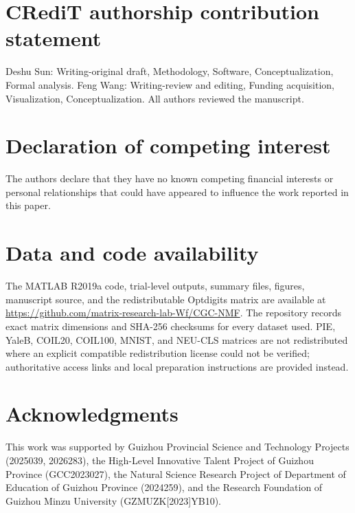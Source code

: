 \documentclass[11pt]{article}
\theoremstyle{remark}
\begin{document}
\section*{CRediT authorship contribution statement}

Deshu Sun: Writing-original draft, Methodology, Software, Conceptualization, Formal analysis.  Feng Wang: Writing-review and editing, Funding acquisition, Visualization, Conceptualization. All authors reviewed the manuscript.


\section*{Declaration of competing interest}
The authors declare that they have no known competing financial interests or personal relationships that could have appeared to influence the work reported in this paper.

\section*{Data and code availability}

The MATLAB R2019a code, trial-level outputs, summary files, figures, manuscript source, and the redistributable Optdigits matrix are available at \url{https://github.com/matrix-research-lab-Wf/CGC-NMF}. The repository records exact matrix dimensions and SHA-256 checksums for every dataset used. PIE, YaleB, COIL20, COIL100, MNIST, and NEU-CLS matrices are not redistributed where an explicit compatible redistribution license could not be verified; authoritative access links and local preparation instructions are provided instead.

\section*{Acknowledgments}
This work was supported by Guizhou Provincial Science and Technology Projects (2025039, 2026283), the High-Level Innovative Talent Project of Guizhou Province (GCC2023027), the Natural Science Research Project of Department of Education of Guizhou Province (2024259), and the Research Foundation of Guizhou Minzu University (GZMUZK[2023]YB10).


\end{document}

